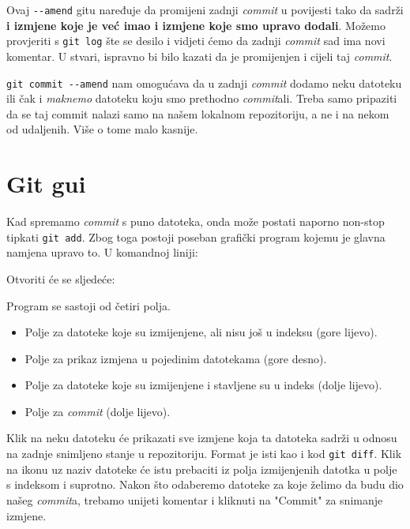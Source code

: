 
Ovaj \verb+--amend+ gitu naređuje da promijeni zadnji \emph{commit} u povijesti tako da sadrži \textbf{i izmjene koje je već imao i izmjene koje smo upravo dodali}.
Možemo provjeriti s \verb+git log+ šte se desilo i vidjeti ćemo da zadnji \emph{commit} sad ima novi komentar.
U stvari, ispravno bi bilo kazati da je promijenjen i cijeli taj \emph{commit}.

\verb+git commit --amend+ nam omogućava da u zadnji \emph{commit} dodamo neku datoteku ili čak i \emph{maknemo} datoteku koju smo prethodno \emph{commit}ali. 
Treba samo pripaziti da se taj commit nalazi samo na našem lokalnom repozitoriju, a ne i na nekom od udaljenih. 
Više o tome malo kasnije.

\section*{Git gui}

Kad spremamo \emph{commit} s puno datoteka, onda može postati naporno non-stop tipkati \verb+git add+.
Zbog toga postoji poseban grafički program kojemu je glavna namjena upravo to.
U komandnoj liniji:


Otvoriti će se sljedeće:


Program se sastoji od četiri polja. 

\begin{itemize}
	\item Polje za datoteke koje su izmijenjene, ali nisu još u indeksu (gore lijevo).
	\item Polje za prikaz izmjena u pojedinim datotekama (gore desno). 
	\item Polje za datoteke koje su izmijenjene i stavljene su u indeks (dolje lijevo).
	\item Polje za \emph{commit} (dolje lijevo).
\end{itemize}

Klik na neku datoteku će prikazati sve izmjene koja ta datoteka sadrži u odnosu na zadnje snimljeno stanje u repozitoriju.
Format je isti kao i kod \verb+git diff+.
Klik na ikonu uz naziv datoteke će istu prebaciti iz polja izmijenjenih datotka u polje s indeksom i suprotno.
Nakon što odaberemo datoteke za koje želimo da budu dio našeg \emph{commit}a, trebamo unijeti komentar i kliknuti na "Commit" za snimanje izmjene.

